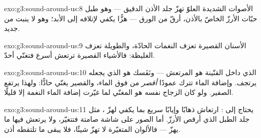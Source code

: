 \begin{solution}{exo:g3:sound-around-us:8}
الأصوات الشديدة العلوّ تهزّ جلد الأذن الدقيق --- وهو طبل حبّات
الأرزّ الخاصّ بالأذن، أرقّ من الورق --- هزًّا يكفي لإتلافه إلى
الأبد؛ وهو لا ينبت من جديد.
\end{solution}

\begin{solution}{exo:g3:sound-around-us:9}
الأسنان القصيرة تعزف النغمات الحادّة، والطويلة تعزف الغليظة:
فالأشياء القصيرة ترتعش أسرع فتغنّي أحدّ.
\end{solution}

\begin{solution}{exo:g3:sound-around-us:10}
 الذي داخل القنّينة هو المرتعش --- ونَفَسك هو الذي يجعله
يرتجف. وإضافة الماء تترك عمودًا \emph{أقصر} من  فوق
الماء، والقصير يغنّي حادًّا: ولهذا يرتفع الصفير. ولو كان الزجاج
نفسه هو المغنّي لما غيّرت إضافة الماء النغمة إلا قليلًا.
\end{solution}

\begin{solution}{exo:g3:sound-around-us:11}
 يحتاج إلى \emph{}: ارتعاش ذهابًا وإيابًا سريع بما
يكفي لهزّ ، مثل جلد الطبل الذي أرقص الأرزّ. أما الصور على
شاشة صامتة فتتغيّر، ولا يرتعش فيها ما يهزّ  --- فالألوان
المتغيّرة لا تهزّ شيئًا، فلا يبقى ما تلتقطه أذن.
\end{solution}
